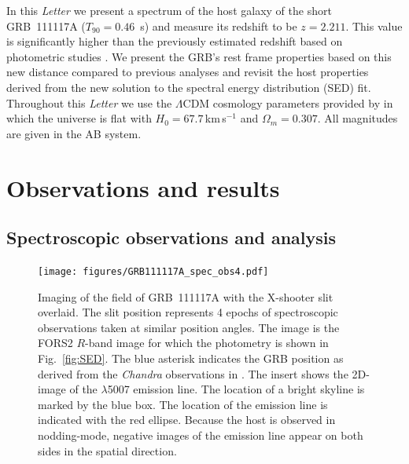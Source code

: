 \documentclass{aa}    %
\begin{document}
In this \emph{Letter} we present a spectrum of the host galaxy of the short
GRB~111117A ($T_{90}=0.46$~s) and measure its redshift to be $z=2.211$. This
value is significantly higher than the previously estimated redshift based on
photometric studies \citep{Margutti2012,Sakamoto2013}. We present the GRB's rest
frame properties based on this new distance compared to previous analyses and
revisit the host properties derived from the new solution to the spectral energy distribution (SED) fit.
Throughout this \emph{Letter} we use the $\Lambda$CDM cosmology parameters provided by
\citet{Planck2015} in which the universe is flat with $H_0 = 67.7$\,km\,s$^{-1}$
and $\Omega_m = 0.307$. All magnitudes are given in the AB system.


\section{Observations and results}

\subsection{Spectroscopic observations and analysis}

\begin{figure}
	\centering
	\texttt{[image: figures/GRB111117A\_spec\_obs4.pdf]}
	\caption{
	Imaging of the field of GRB~111117A with the X-shooter slit overlaid. The slit
	position represents 4 epochs of spectroscopic observations taken at similar
	position angles. The image is the FORS2 $R$-band image for which the photometry
	is shown in Fig.~\ref{fig:SED}. The blue asterisk indicates the GRB position as
	derived from the \emph{Chandra} observations in \citet{Sakamoto2013}. The
	insert shows the 2D-image of the \oiii$\lambda$5007 emission line. The location
	of a bright skyline is marked by the blue box. The location of the emission
	line is indicated with the red ellipse. Because the host is observed in
	nodding-mode, negative images of the emission line appear on both sides in the
	spatial direction.
	}
	\label{fig:spec_setup}
\end{figure}
\end{document}
